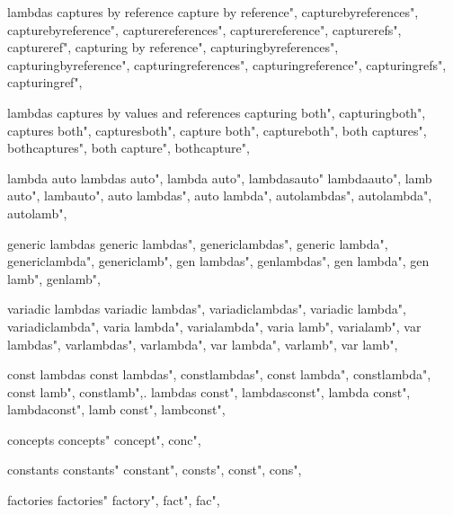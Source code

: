          lambdas captures by reference 
        capture by reference",  
        capturebyreferences",  
        capturebyreference",  
        capturereferences",  
        capturereference",  
        capturerefs",  
        captureref",  
        capturing by reference",  
        capturingbyreferences",  
        capturingbyreference",  
        capturingreferences",  
        capturingreference",  
        capturingrefs",  
        capturingref",  
        
         lambdas captures by values and references 
        capturing both",  
        capturingboth",  
        captures both",  
        capturesboth",  
        capture both",  
        captureboth",  
        both captures",  
        bothcaptures",  
        both capture",  
        bothcapture",  
        
         lambda auto
        lambdas auto",
        lambda auto",
        lambdasauto"
        lambdaauto",
        lamb auto",
        lambauto",
        auto lambdas",
        auto lambda",
        autolambdas",
        autolambda",
        autolamb",
        
         generic lambdas
        generic lambdas",  
        genericlambdas",  
        generic lambda",  
        genericlambda",  
        genericlamb",  
        gen lambdas",  
        genlambdas",  
        gen lambda",  
        gen lamb",  
        genlamb",  
        
         variadic lambdas 
        variadic lambdas",  
        variadiclambdas",  
        variadic lambda",  
        variadiclambda",  
        varia lambda",  
        varialambda",  
        varia lamb",  
        varialamb",  
        var lambdas",  
        varlambdas",  
        varlambda",  
        var lambda",  
        varlamb",  
        var lamb",  
        
         const lambdas 
        const lambdas",
        constlambdas",
        const lambda",
        constlambda",
        const lamb",
        constlamb",.
        lambdas const",
        lambdasconst",
        lambda const",
        lambdaconst",
        lamb const",
        lambconst",
        
         concepts 
        concepts"
        concept",
        conc",
        
         constants 
        constants"
        constant",
        consts",
        const", 
        cons",
        
         factories 
        factories"
        factory",
        fact",
        fac",
        
